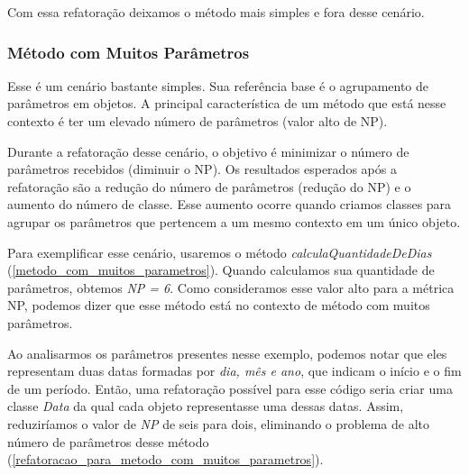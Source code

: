 

	Com essa refatoração deixamos o método mais simples e fora desse cenário.


\subsubsection{Método com Muitos Parâmetros}

	Esse é um cenário bastante simples. Sua referência base é o agrupamento de parâmetros em objetos. A principal característica de um método que está nesse contexto é ter um elevado número de parâmetros (valor alto de NP).
	
	Durante a refatoração desse cenário, o objetivo é minimizar o número de parâmetros recebidos (diminuir o NP). Os resultados esperados após a refatoração são a redução do número de parâmetros (redução do NP) e o aumento do número de classe. Esse aumento ocorre quando criamos classes para agrupar os parâmetros que pertencem a um mesmo contexto em um único objeto.
	                                       
	Para exemplificar esse cenário, usaremos o método \textit{calculaQuantidadeDeDias} (\ref{metodo_com_muitos_parametros}). Quando calculamos sua quantidade de parâmetros, obtemos \textit{NP = 6}. Como consideramos esse valor alto para a métrica NP, podemos dizer que esse método está no contexto de método com muitos parâmetros.                    

                   
                                
	Ao analisarmos os parâmetros presentes nesse exemplo, podemos notar que eles representam duas datas formadas por \textit{dia, mês e ano}, que indicam o início e o fim de um período. Então, uma refatoração possível para esse código seria criar uma classe \textit{Data} da qual cada objeto representasse uma dessas datas. Assim, reduziríamos o valor de \textit{NP} de seis para dois, eliminando o problema de alto número de parâmetros desse método (\ref{refatoracao_para_metodo_com_muitos_parametros}). 

